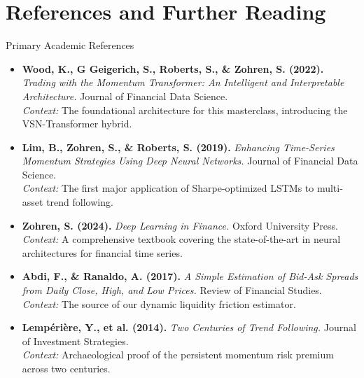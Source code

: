 \section{References and Further Reading}

\begin{frame}[allowframebreaks]{Primary Academic References}
    \begin{itemize}
        \item \textbf{Wood, K., G Geigerich, S., Roberts, S., \& Zohren, S. (2022).} \textit{Trading with the Momentum Transformer: An Intelligent and Interpretable Architecture.} Journal of Financial Data Science. \\
        \textit{Context:} The foundational architecture for this masterclass, introducing the VSN-Transformer hybrid.
        
        \item \textbf{Lim, B., Zohren, S., \& Roberts, S. (2019).} \textit{Enhancing Time-Series Momentum Strategies Using Deep Neural Networks.} Journal of Financial Data Science. \\
        \textit{Context:} The first major application of Sharpe-optimized LSTMs to multi-asset trend following.
        
        \item \textbf{Zohren, S. (2024).} \textit{Deep Learning in Finance.} Oxford University Press. \\
        \textit{Context:} A comprehensive textbook covering the state-of-the-art in neural architectures for financial time series.
        
        \item \textbf{Abdi, F., \& Ranaldo, A. (2017).} \textit{A Simple Estimation of Bid-Ask Spreads from Daily Close, High, and Low Prices.} Review of Financial Studies. \\
        \textit{Context:} The source of our dynamic liquidity friction estimator.
        
        \item \textbf{Lemp\'eri\`ere, Y., et al. (2014).} \textit{Two Centuries of Trend Following.} Journal of Investment Strategies. \\
        \textit{Context:} Archaeological proof of the persistent momentum risk premium across two centuries.
    \end{itemize}
\end{frame}
